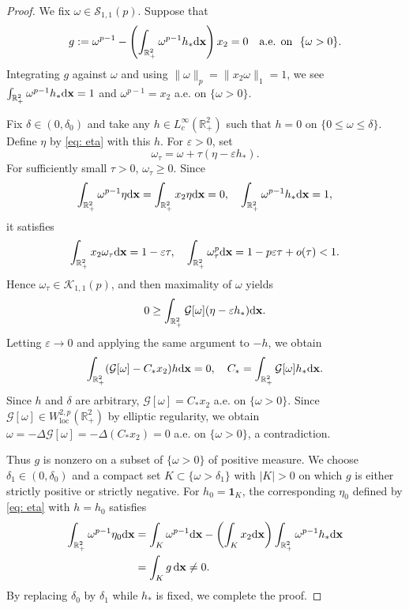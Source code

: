 \documentclass[11pt]{amsart}
\theoremstyle{definition}
\theoremstyle{definition}
\numberwithin{equation}{section}
\newcommand{\0}{\emptyset}
\newcommand{\bfx}{{\bf x}}
\newcommand{\calK}{\mathcal K}
\newcommand{\calS}{\mathcal S}
\newcommand{\dd}{\mathrm{d}}
\begin{document}
{
\begin{proof}
    We fix $\omega \in \calS_{1, 1}(p)$.
    Suppose that
    \[
    g := \omega^{p-1} - \left(\int_{\mathbb{R}^2_+} \omega^{p-1}h_*\dd\bfx \right) x_2 = 0 \quad \textrm{a.e. on }\,\, \{ \omega > 0 \}.
    \]
    Integrating $g$ against $\omega$ and using $\|\omega\|_p = \|x_2\omega\|_1 = 1$, we see $\int_{\mathbb{R}^2_+} \omega^{p-1}h_*\dd\bfx = 1$ and $\omega^{p-1} = x_2$ a.e. on $\{ \omega > 0 \}$.

    Fix $\delta\in(0,\delta_0)$ and take any $h \in L^\infty_c (\mathbb{R}^2_+)$ such that $h = 0$ on $\{ 0 \le \omega \le \delta \}$.
    Define $\eta$ by \eqref{eq: eta} with this $h$.
    For $\varepsilon>0$, set
    \[
    \omega_\tau = \omega + \tau(\eta - \varepsilon h_*).
    \]
    For sufficiently small $\tau > 0$, $\omega_{\tau} \ge 0$.
    Since
    \[
    \int_{\mathbb{R}^2_+}\omega^{p-1}\eta \dd\bfx = \int_{\mathbb{R}^2_+} x_2 \eta \dd\bfx = 0, \quad \int_{\mathbb{R}^2_+}\omega^{p-1}h_* \dd\bfx = 1,
    \]
    it satisfies
    \[
    \int_{\mathbb{R}^2_+}x_2\omega_\tau \dd \bfx = 1 - \varepsilon \tau, \quad \int_{\mathbb{R}^2_+}\omega_\tau^p \dd\bfx = 1 - p \varepsilon \tau + o(\tau) < 1.
    \]
    Hence $\omega_\tau\in\calK_{1,1}(p)$, and then maximality of $\omega$ yields
    \[
    0 \ge \int_{\mathbb{R}^2_+} \mathcal{G}[\omega] (\eta - \varepsilon h_*) \dd\bfx.
    \]
    Letting $\varepsilon \to 0$ and applying the same argument to $-h$, we obtain
    \[
    \int_{\mathbb{R}^2_+}(\mathcal{G}[\omega] - C_* x_2) h \dd \bfx = 0, \quad C_*=\int_{\mathbb{R}^2_+}\mathcal{G}[\omega] h_*\dd\bfx.
    \]
    Since $h$ and $\delta$ are arbitrary, $\mathcal{G}[\omega] = C_* x_2$ a.e. on $\{ \omega > 0 \}$.
    Since $\mathcal{G}[\omega] \in W^{2,p}_{\mathrm{loc}}(\mathbb{R}^2_+)$ by elliptic regularity, we obtain $\omega = -\Delta \mathcal{G}[\omega] = -\Delta (C_*x_2) = 0$ a.e. on $\{\omega > 0\}$, a contradiction.

    Thus $g$ is nonzero on a subset of $\{\omega > 0\}$ of positive measure.
    We choose $\delta_1 \in (0, \delta_0)$ and a compact set $K \subset \{\omega > \delta_1 \}$ with $|K| > 0$ on which $g$ is either strictly positive or strictly negative.
    For $h_0 = \mathbf{1}_K$, the corresponding $\eta_0$ defined by \eqref{eq: eta} with $h = h_0$ satisfies
    \begin{align*}
    \int_{\mathbb{R}^2_+}\omega^{p-1}\eta_0 \dd \bfx &= \int_{K} \omega^{p-1}  \dd \bfx - \left( \int_K x_2 \dd \bfx\right) \int_{\mathbb{R}^2_+} \omega^{p-1}h_* \dd \bfx \\
    &= \int_K g \, \dd \bfx \neq 0.
    \end{align*}
    By replacing $\delta_0$ by $\delta_1$ while $h_*$ is fixed, we complete the proof.
\end{proof}

}
		
\end{document}
